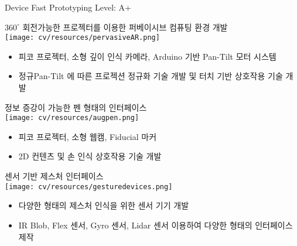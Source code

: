 \begin{cventries}
  \cventry
    {Device Fast Prototyping} %
    {} %
    {} %
    {Level: A+} %
    {
      \begin{cvitems} %
        \item {$360^{\circ}$ 회전가능한 프로젝터를 이용한 퍼베이시브 컴퓨팅 환경 개발 \\
          \texttt{[image: cv/resources/pervasiveAR.png]}
          \begin{itemize}
              \item {피코 프로젝터, 소형 깊이 인식 카메라, Arduino 기반 Pan-Tilt 모터 시스템}
              \item {정규Pan-Tilt 에 따른 프로젝션 정규화 기술 개발 및 터치 기반 상호작용 기술 개발}
          \end{itemize}
        }
        \item {정보 증강이 가능한 펜 형태의 인터페이스 \\
          \texttt{[image: cv/resources/augpen.png]}
          \begin{itemize}
            \item {피코 프로젝터, 소형 웹캠, Fiducial 마커}
            \item {2D 컨텐츠 및 손 인식 상호작용 기술 개발}
          \end{itemize}
        }
        \item {센서 기반 제스처 인터페이스 \\
          \texttt{[image: cv/resources/gesturedevices.png]}
          \begin{itemize}
            \item {다양한 형태의 제스처 인식을 위한 센서 기기 개발}
            \item {IR Blob, Flex 센서, Gyro 센서, Lidar 센서 이용하여 다양한 형태의 인터페이스 제작}
          \end{itemize}
        }
      \end{cvitems} 
    }

\end{cventries}
